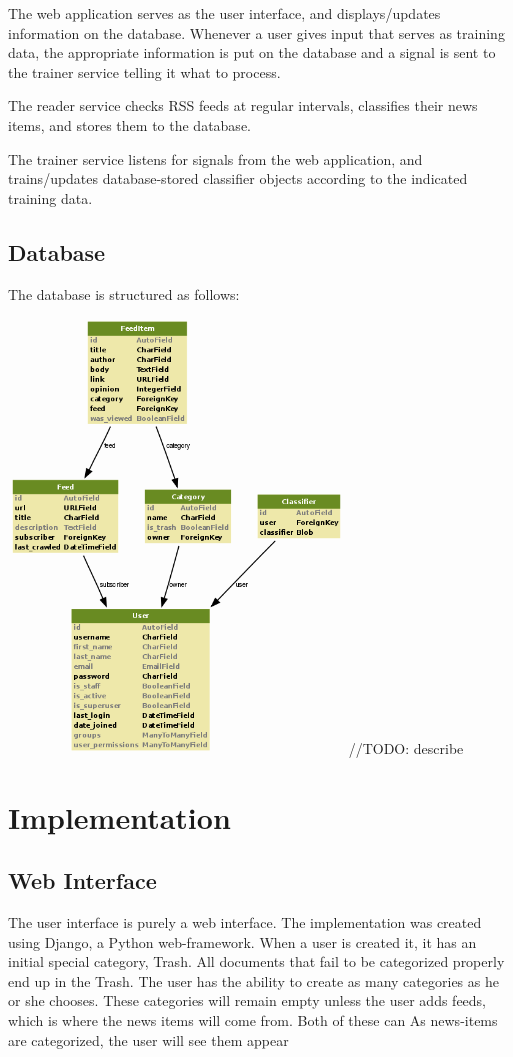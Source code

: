 \documentclass[letterpaper]{article}
\begin{document}
The web application serves as the user interface, and displays/updates information on the database. Whenever a user gives input that serves as training data, the appropriate information is put on the database and a signal is sent to the trainer service telling it what to process.

The reader service checks RSS feeds at regular intervals, classifies their news items, and stores them to the database.

The trainer service listens for signals from the web application, and trains/updates database-stored classifier objects according to the indicated training data.

\subsection{Database}
The database is structured as follows:

\noindent\includegraphics[width=3.5in]{db-diagram.png}
//TODO: describe


\section{Implementation}
\subsection{Web Interface}
The user interface is purely a web interface.  The implementation was created using Django, a Python web-framework.  When a user is created it, it has an initial special category, Trash. All documents that fail to be categorized properly end up in the Trash.  The user has the ability to create as many categories as he or she chooses.  These categories will remain empty unless the user adds feeds, which is where the news items will come from. Both of these can  As news-items are categorized, the user will see them appear
\end{document}
